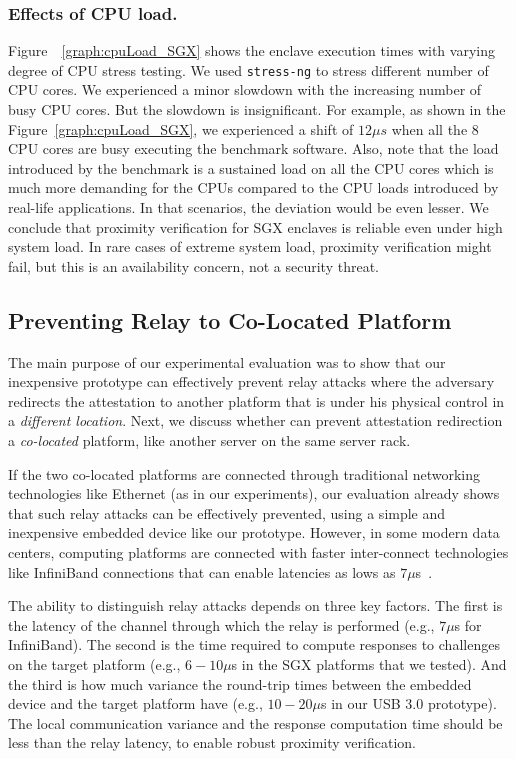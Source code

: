 \subsubsection{Effects of CPU load.} Figure~~\ref{graph:cpuLoad_SGX} shows the enclave execution times with varying degree of CPU stress testing. We used \texttt{stress-ng} to stress different number of CPU cores. We experienced a minor slowdown with the increasing number of busy CPU cores. But the slowdown is insignificant. For example, as shown in the Figure~\ref{graph:cpuLoad_SGX}, we experienced a shift of $12\mu s$ when all the 8 CPU cores are busy executing the benchmark software. Also, note that the load introduced by the benchmark is a sustained load on all the CPU cores which is much more demanding for the CPUs compared to the CPU loads introduced by real-life applications. In that scenarios, the deviation would be even lesser. We conclude that proximity verification for SGX enclaves is reliable even under high system load. In rare cases of extreme system load, proximity verification might fail, but this is an availability concern, not a security threat.


\subsection{Preventing Relay to Co-Located Platform}
\label{sec:co-located}

The main purpose of our experimental evaluation was to show that our inexpensive \name prototype can effectively prevent relay attacks where the adversary redirects the attestation to another platform that is under his physical control in a \emph{different location}. Next, we discuss whether \name can prevent attestation redirection a \emph{co-located} platform, like another server on the same server rack.

If the two co-located platforms are connected through traditional networking technologies like Ethernet (as in our experiments), our evaluation already shows that such relay attacks can be effectively prevented, using a simple and inexpensive embedded device like our prototype. However, in some modern data centers, computing platforms are connected with faster inter-connect technologies like InfiniBand connections that can enable latencies as lows as $7 \mu$s~\cite{liu2003performance}. 

The ability to distinguish relay attacks depends on three key factors. The first is the latency of the channel through which the relay is performed (e.g., $7 \mu$s for InfiniBand). The second is the time required to compute responses to challenges on the target platform (e.g., $6-10 \mu$s in the SGX platforms that we tested). And the third is how much variance the round-trip times between the embedded device and the target platform have (e.g., $10-20 \mu$s in our USB 3.0 prototype). The local communication variance and the response computation time should be less than the relay latency, to enable robust proximity verification. 


